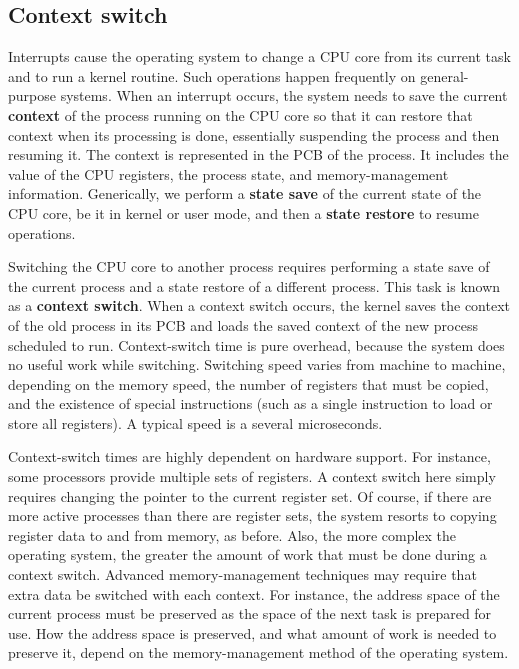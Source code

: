 \subsection*{Context switch}\label{sec:3.2:context_switch}
Interrupts cause the operating system to change a CPU core from its current task and to run a kernel routine. Such operations happen frequently on general-purpose systems. When an interrupt occurs, the system needs to save the current \textbf{context} of the process running on the CPU core so that it can restore that context when its processing is done, essentially suspending the process and then resuming it. The context is represented in the PCB of the process. It includes the value of the CPU registers, the process state, and memory-management information. Generically, we perform a \textbf{state save} of the current state of the CPU core, be it in kernel or user mode, and then a \textbf{state restore} to resume operations.

Switching the CPU core to another process requires performing a state save of the current process and a state restore of a different process. This task is known as a \textbf{context switch}. When a context switch occurs, the kernel saves the context of the old process in its PCB and loads the saved context of the new process scheduled to run. Context-switch time is pure overhead, because the system does no useful work while switching. Switching speed varies from machine to machine, depending on the memory speed, the number of registers that must be copied, and the existence of special instructions (such as a single instruction to load or store all registers). A typical speed is a several microseconds.

Context-switch times are highly dependent on hardware support. For instance, some processors provide multiple sets of registers. A context switch here simply requires changing the pointer to the current register set. Of course, if there are more active processes than there are register sets, the system resorts to copying register data to and from memory, as before. Also, the more complex the operating system, the greater the amount of work that must be done during a context switch. Advanced memory-management techniques may require that extra data be switched with each context. For instance, the address space of the current process must be preserved as the space of the next task is prepared for use. How the address space is preserved, and what amount of work is needed to preserve it, depend on the memory-management method of the operating system.

